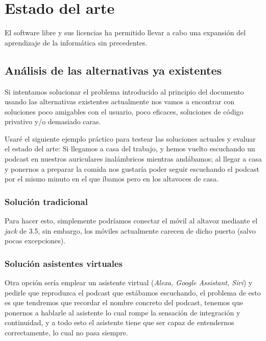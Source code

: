 \chapter{Estado del arte}

El software libre y sus licencias \cite{gplv3} ha permitido llevar a cabo una expansión del
aprendizaje de la informática sin precedentes.

\section{Análisis de las alternativas ya existentes}

Si intentamos solucionar el problema introducido al principio del documento
usando las alternativas existentes actualmente nos vamos a encontrar con
soluciones poco amigables con el usuario, poco eficaces, soluciones de código
privativo y/o demasiado caras.

Usaré el siguiente ejemplo práctico para testear las soluciones actuales y
evaluar el estado del arte: Si llegamos a casa del trabajo, y hemos vuelto
escuchando un podcast en nuestros auriculares inalámbricos mientras andábamos;
al llegar a casa y ponernos a preparar la comida nos gustaría poder seguir
escuchando el podcast por el mismo minuto en el que íbamos pero en los altavoces
de casa. 

\subsection{Solución tradicional}
Para hacer esto, simplemente podríamos conectar el móvil al altavoz mediante el
\emph{jack} de 3.5, sin embargo, los móviles actualmente carecen de dicho puerto
(salvo pocas excepciones). 

\subsection{Solución asistentes virtuales}
Otra opción sería emplear un asistente virtual (\emph{Alexa, Google Assistant,
Siri}) y pedirle que reproduzca el podcast que estábamos escuchando, el problema
de esto es que tendremos que recordar el nombre concreto del podcast, tenemos
que ponernos a hablarle al asistente lo cual rompe la sensación de integración y
continuidad, y a todo esto el asistente tiene que ser capaz de entendernos
correctamente, lo cual no pasa siempre. 

